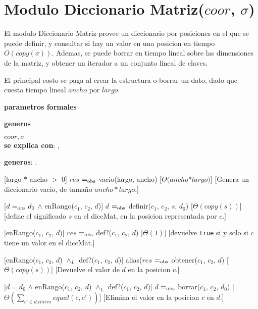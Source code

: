 \section{Modulo Diccionario Matriz($coor$, $\sigma$)}

El modulo Diccionario Matriz provee un diccionario por posiciones en el que se puede definir, y consultar si hay un valor en una posicion en tiempo $O(copy(\sigma))$. Ademas, se puede borrar en tiempo lineal sobre las dimensiones de la matriz, y obtener un iterador a un conjunto lineal de claves.

El principal costo se paga al crear la estructura o borrar un dato, dado que cuesta tiempo lineal $ancho$ por $largo$.

\begin{Interfaz}

  \textbf{parametros formales}\parindent\\
  \parbox{1.7cm}{\textbf{generos}}$coor,\sigma$\\
  \textbf{se explica con}: ,

  \textbf{generos}: .

  [largo $*$ ancho $>$ 0]
  {$res$ $=_{\mathrm{obs}}$ vacio(largo, ancho)}%
  [$\Theta(ancho $*$ largo)$]
  [Genera un diccionario vacio, de tamaño $ancho*largo$.]

  [$d =_{\mathrm{obs}} d_0$ $\land$ enRango($c_1$, $c_2$, $d$)]
  {$d$ $=_{\mathrm{obs}}$ definir($c_1$, $c_2$, $s$, $d_0$)}
  [$\Theta(copy(s))$]
  [define el significado $s$ en el diccMat, en la posicion representada por $c$.]

  [enRango($c_1$, $c_2$, $d$)]
  {$res$ $=_{\mathrm{obs}}$ def?($c_1$, $c_2$, $d$)}
  [$\Theta(1)$]
  [devuelve \texttt{true} si y solo si $c$ tiene un valor en el diccMat.]

  [enRango($c_1$, $c_2$, $d$) $\land_L$ def?($c_1$, $c_2$, $d$)] 
  {alias($res$ $=_{\mathrm{obs}}$ obtener($c_1$, $c_2$, $d$)}
  [$\Theta(copy(s))$]
  [Devuelve el valor de $d$ en la posicion $c$.]

  [$d = d_0$ $\land$ enRango($c_1$, $c_2$, $d$) $\land_L$ def?($c_1$, $c_2$, $d$)]
  {$d$ $=_{\mathrm{obs}}$ borrar($c_1$, $c_2$, $d_0$)}
  [$\Theta\left(\displaystyle\sum_{c' \in d.claves}equal(c,c')\right)$]
  [Elimina el valor en la posicion $c$ en $d$.]


\end{Interfaz}
